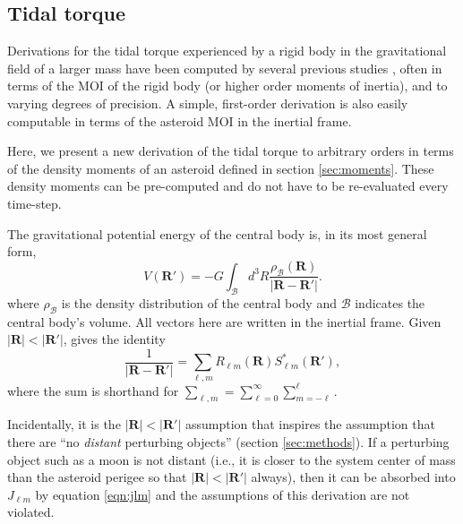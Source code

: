 \documentclass[fleqn,usenatbib]{mnras}
\begin{document}
\subsection{Tidal torque}
\label{sec:tidal-torque}

Derivations for the tidal torque experienced by a rigid body in the gravitational field of a larger mass have been computed by several previous studies \citep{paul88,HouMar2017,BOUE2009750, ashenberg07}, often in terms of the MOI of the rigid body (or higher order moments of inertia), and to varying degrees of precision. A simple, first-order derivation is also easily computable in terms of the asteroid MOI in the inertial frame.

Here, we present a new derivation of the tidal torque to arbitrary orders in terms of the density moments of an asteroid defined in section \ref{sec:moments}. These density moments can be pre-computed and do not have to be re-evaluated every time-step.

The gravitational potential energy of the central body is, in its most general form,
\begin{equation}
V(\bm R') = -G\int_\mathcal{B} d^3 R \frac{\rho_\mathcal{B}(\bm R)}{|\bm{R}-\bm{R'}|}.
\label{eqn:first-pe}
\end{equation}
where $\rho_\mathcal{B}$ is the density distribution of the central body and $\mathcal{B}$ indicates the central body's volume. All vectors here are written in the inertial frame. Given $|\bm{R}| < |\bm{R'}|$, \cite{Gelderen1998TheSO} gives the identity
\begin{equation}
  \frac{1}{|\bm R - \bm R'|} = \sum_{\ell, m} R_{\ell m}(\bm R) S_{\ell m}^*(\bm R'),
  \label{eqn:ylm-expansion}
\end{equation}
where the sum is shorthand for $\sum_{\ell, m} = \sum_{\ell = 0}^\infty \sum_{m=-\ell}^\ell$.

Incidentally, it is the $|\bm R| < |\bm R'|$ assumption that inspires the assumption that there are ``no \textit{distant} perturbing objects'' (section \ref{sec:methods}). If a perturbing object such as a moon is not distant (i.e., it is closer to the system center of mass than the asteroid perigee so that $|\bm R| < |\bm R'|$ always), then it can be absorbed into $J_{\ell m}$ by equation \ref{eqn:jlm} and the assumptions of this derivation are not violated.
\end{document}
